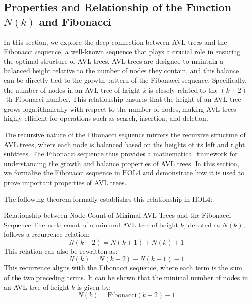 \documentclass[12pt]{article}
\begin{document}
\begin{itemize}
\section{Properties and Relationship of the Function \( N(k) \) and Fibonacci}

In this section, we explore the deep connection between AVL trees and the Fibonacci sequence, a well-known sequence that plays a crucial role in ensuring the optimal structure of AVL trees. AVL trees are designed to maintain a balanced height relative to the number of nodes they contain, and this balance can be directly tied to the growth pattern of the Fibonacci sequence. Specifically, the number of nodes in an AVL tree of height \( k \) is closely related to the \( (k+2) \)-th Fibonacci number. This relationship ensures that the height of an AVL tree grows logarithmically with respect to the number of nodes, making AVL trees highly efficient for operations such as search, insertion, and deletion.

The recursive nature of the Fibonacci sequence mirrors the recursive structure of AVL trees, where each node is balanced based on the heights of its left and right subtrees. The Fibonacci sequence thus provides a mathematical framework for understanding the growth and balance properties of AVL trees. In this section, we formalize the Fibonacci sequence in HOL4 and demonstrate how it is used to prove important properties of AVL trees.

The following theorem formally establishes this relationship in HOL4:

\begin{block}{Relationship between Node Count of Minimal AVL Trees and the Fibonacci Sequence}
    The node count of a minimal AVL tree of height $k$, denoted as $N(k)$, follows a recurrence relation:
    \[
        N(k+2) = N(k+1) + N(k) + 1
    \]
    This relation can also be rewritten as:
    \[
        N(k) = N(k+2) - N(k+1) - 1
    \]
    This recurrence aligns with the Fibonacci sequence, where each term is the sum of the two preceding terms. It can be shown that the minimal number of nodes in an AVL tree of height $k$ is given by:
    \[
        N(k) = \text{Fibonacci}(k+2) - 1
    \]
 \end{block}


\end{itemize}
\end{document}
